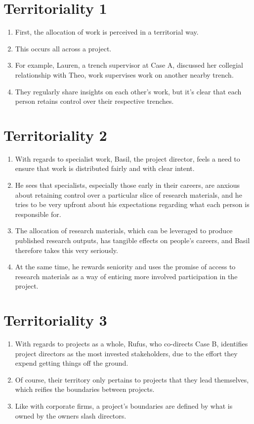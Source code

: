 \documentclass[12pt]{article}
\begin{document}
\section{Territoriality 1}
\begin{enumerate}
  \item First, the allocation of work is perceived in a territorial way.
  \item This occurs all across a project.
  \item For example, Lauren, a trench supervisor at Case A, discussed her collegial relationship with Theo, work supervises work on another nearby trench.
  \item They regularly share insights on each other's work, but it's clear that each person retains control over their respective trenches.
\end{enumerate}

\section{Territoriality 2}
\begin{enumerate}
  \item With regards to specialist work, Basil, the project director, feels a need to ensure that work is distributed fairly and with clear intent.
  \item He sees that specialists, especially those early in their careers, are anxious about retaining control over a particular slice of research materials, and he tries to be very upfront about his expectations regarding what each person is responsible for.
  \item The allocation of research materials, which can be leveraged to produce published research outputs, has tangible effects on people's careers, and Basil therefore takes this very seriously.
  \item At the same time, he rewards seniority and uses the promise of access to research materials as a way of enticing more involved participation in the project.
\end{enumerate}
  
\section{Territoriality 3}
\begin{enumerate}
  \item With regards to projects as a whole, Rufus, who co-directs Case B, identifies project directors as the most invested stakeholders, due to the effort they expend getting things off the ground.
  \item Of course, their territory only pertains to projects that they lead themselves, which reifies the boundaries between projects.
  \item Like with corporate firms, a project's boundaries are defined by what is owned by the owners slash directors.
\end{enumerate}
  
\end{document}
